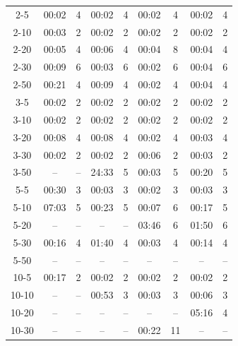 \documentclass[
  printed, %
  oneside, %
  notable,   %
  nolof,     %
  nolot,     %
]{fithesis3}
\begin{document}
\begin{table}[hp!]
\begin{tabular}{c|cc|cc|cc|cc}
2-5  & 00:02 & 4 & 00:02 & 4 & \cellcolor{table-green}00:02 & \cellcolor{table-green}4 & 00:02 & 4 \\
2-10  & 00:03 & 2 & 00:02 & 2 & \cellcolor{table-green}00:02 & \cellcolor{table-green}2 & 00:02 & 2 \\
2-20  & 00:05 & 4 & 00:06 & 4 & 00:04 & 8 & \cellcolor{table-green}00:04 & \cellcolor{table-green}4 \\
2-30  & 00:09 & 6 & 00:03 & 6 & \cellcolor{table-green}00:02 & \cellcolor{table-green}6 & 00:04 & 6 \\
2-50  & 00:21 & 4 & 00:09 & 4 & \cellcolor{table-green}00:02 & \cellcolor{table-green}4 & 00:04 & 4 \\ \hline
3-5  & 00:02 & 2 & 00:02 & 2 & \cellcolor{table-green}00:02 & \cellcolor{table-green}2 & 00:02 & 2 \\
3-10  & 00:02 & 2 & 00:02 & 2 & \cellcolor{table-green}00:02 & \cellcolor{table-green}2 & 00:02 & 2 \\
3-20  & 00:08 & 4 & 00:08 & 4 & \cellcolor{table-green}00:02 & \cellcolor{table-green}4 & 00:03 & 4 \\
3-30  & 00:02 & 2 & \cellcolor{table-green}00:02 & \cellcolor{table-green}2 & 00:06 & 2 & 00:03 & 2 \\
3-50  & -- & -- & 24:33 & 5 & \cellcolor{table-green}00:03 & \cellcolor{table-green}5 & 00:20 & 5 \\ \hline
5-5  & 00:30 & 3 & 00:03 & 3 & \cellcolor{table-green}00:02 & \cellcolor{table-green}3 & 00:03 & 3 \\
5-10  & 07:03 & 5 & 00:23 & 5 & \cellcolor{table-green}00:07 & \cellcolor{table-green}6 & 00:17 & 5 \\
5-20  & -- & -- & -- & -- & 03:46 & 6 & \cellcolor{table-green}01:50 & \cellcolor{table-green}6 \\
5-30  & 00:16 & 4 & 01:40 & 4 & \cellcolor{table-green}00:03 & \cellcolor{table-green}4 & 00:14 & 4 \\
5-50  & -- & -- & -- & -- & -- & -- & -- & -- \\ \hline
10-5  & 00:17 & 2 & 00:02 & 2 & \cellcolor{table-green}00:02 & \cellcolor{table-green}2 & 00:02 & 2 \\
10-10  & -- & -- & 00:53 & 3 & \cellcolor{table-green}00:03 & \cellcolor{table-green}3 & 00:06 & 3 \\
10-20  & -- & -- & -- & -- & -- & -- & \cellcolor{table-green}05:16 & \cellcolor{table-green}4 \\
10-30  & -- & -- & -- & -- & \cellcolor{table-green}00:22 & \cellcolor{table-green}11 & -- & -- \\

\end{tabular}
\end{table}
\end{document}
